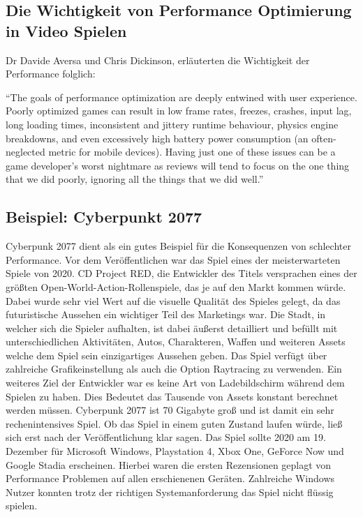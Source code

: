 \subsection{Die Wichtigkeit von Performance Optimierung in Video Spielen}

Dr Davide Aversa und Chris Dickinson, erläuterten die Wichtigkeit der Performance folglich:

"`The goals of performance optimization are deeply entwined with user experience. Poorly optimized games can result in low frame rates, freezes, crashes, input lag, long loading times, inconsistent and jittery runtime behaviour, physics engine breakdowns, and even excessively high battery power consumption (an often-neglected metric for mobile devices). Having just one of these issues can be a game developer's worst nightmare as reviews will tend to focus on the one thing that we did poorly, ignoring all the things that we did well."'\cite[S. 17]{_unity_game_optimization}

\subsection{Beispiel: Cyberpunkt 2077}

Cyberpunk 2077 dient als ein gutes Beispiel für die Konsequenzen von schlechter Performance. Vor dem Veröffentlichen war das Spiel eines der meisterwarteten Spiele von 2020. CD Project RED, die Entwickler des Titels versprachen eines der größten Open-World-Action-Rollenspiele, das je auf den Markt kommen würde. Dabei wurde sehr viel Wert auf die visuelle Qualität des Spieles gelegt, da das futuristische Aussehen ein wichtiger Teil des Marketings war. Die Stadt, in welcher sich die Spieler aufhalten, ist dabei äußerst detailliert und befüllt mit unterschiedlichen Aktivitäten, Autos, Charakteren, Waffen und weiteren Assets welche dem Spiel sein einzigartiges Aussehen geben. Das Spiel verfügt über zahlreiche Grafikeinstellung als auch die Option Raytracing zu verwenden. Ein weiteres Ziel der Entwickler war es keine Art von Ladebildschirm während dem Spielen zu haben. Dies Bedeutet das Tausende von Assets konstant berechnet werden müssen. Cyberpunk 2077 ist 70 Gigabyte groß und ist damit ein sehr rechenintensives Spiel. Ob das Spiel in einem guten Zustand laufen würde, ließ sich erst nach der Veröffentlichung klar sagen. Das Spiel sollte 2020 am 19. Dezember für Microsoft Windows, Playstation 4, Xbox One, GeForce Now und Google Stadia erscheinen. Hierbei waren die ersten Rezensionen geplagt von Performance Problemen auf allen erschienenen Geräten. Zahlreiche Windows Nutzer konnten trotz der richtigen Systemanforderung das Spiel nicht flüssig spielen.

